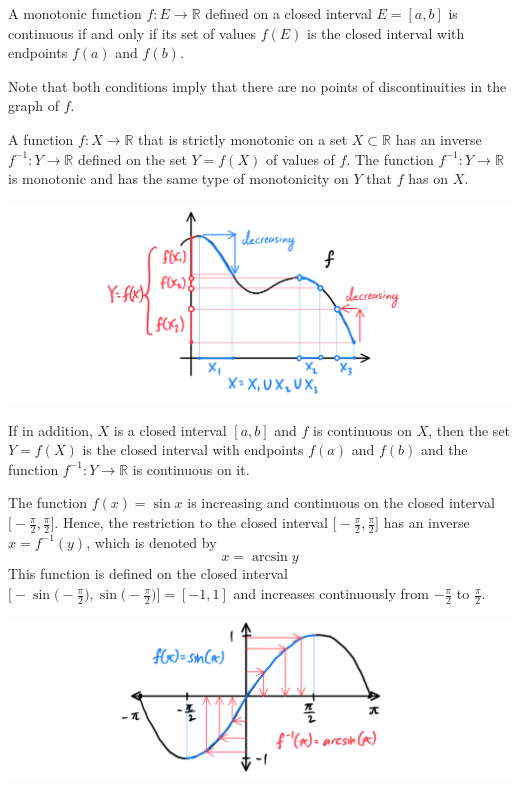\documentclass{article}
\begin{document}
    \begin{lemma}
      A monotonic function $f: E \longrightarrow \mathbb{R}$ defined on a closed interval $E = [a,b]$ is continuous if and only if its set of values $f(E)$ is the closed interval with endpoints $f(a)$ and $f(b)$. 

      Note that both conditions imply that there are no points of discontinuities in the graph of $f$. 
    \end{lemma}


    \begin{theorem}
    A function $f: X \longrightarrow \mathbb{R}$ that is strictly monotonic on a set $X \subset \mathbb{R}$ has an inverse $f^{-1}: Y \longrightarrow \mathbb{R}$ defined on the set $Y = f(X)$ of values of $f$. The function $f^{-1}: Y \longrightarrow \mathbb{R}$ is monotonic and has the same type of monotonicity on $Y$ that $f$ has on $X$. 
    \begin{center}
        \includegraphics[scale=0.25]{img/Inverse_Function_Theorem_Analysis.PNG}
    \end{center}
    If in addition, $X$ is a closed interval $[a,b]$ and $f$ is continuous on $X$, then the set $Y = f(X)$ is the closed interval with endpoints $f(a)$ and $f(b)$ and the function $f^{-1}: Y \longrightarrow \mathbb{R}$ is continuous on it.
    \end{theorem}

    \begin{example}
      The function $f(x) = \sin{x}$ is increasing and continuous on the closed interval $\big[ -\frac{\pi}{2}, \frac{\pi}{2} \big]$. Hence, the restriction to the closed interval $\big[ -\frac{\pi}{2}, \frac{\pi}{2} \big]$ has an inverse $x = f^{-1}(y)$, which is denoted by 
      \[x = \arcsin{y}\]
      This function is defined on the closed interval $\big[- \sin\big(-\frac{\pi}{2}\big), \sin\big(-\frac{\pi}{2}\big) \big] = [-1,1]$ and increases continuously from $-\frac{\pi}{2}$ to $\frac{\pi}{2}$. 
      \begin{center}
          \includegraphics[scale=0.25]{img/Inverse_Function_Theorem_Sin.PNG}
      \end{center}
    \end{example}
\end{document}
